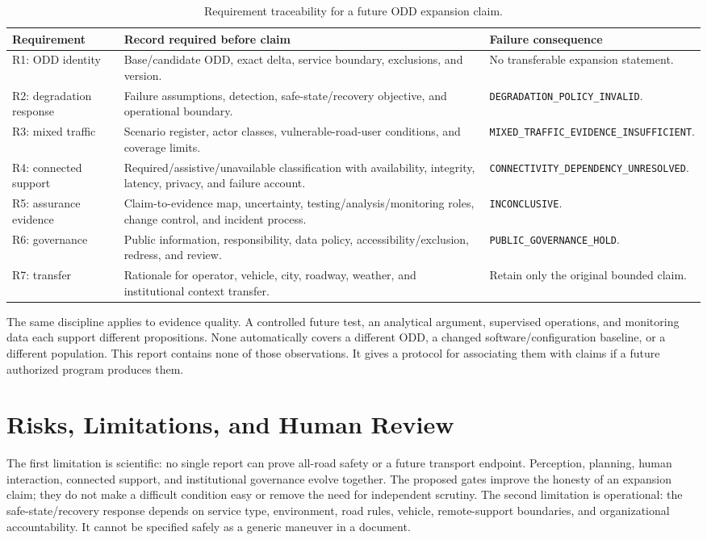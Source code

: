 \documentclass[conference]{../../../../Conference-LaTeX-template_10-17-19/IEEEtran}
\begin{document}
\begin{table}[!t]
\caption{Requirement traceability for a future ODD expansion claim.}
\label{tab:requirements}
\centering
\small
\begin{tabularx}{\textwidth}{lY Y}
\toprule
Requirement & Record required before claim & Failure consequence \\
\midrule
R1: ODD identity & Base/candidate ODD, exact delta, service boundary, exclusions, and version. & No transferable expansion statement. \\
R2: degradation response & Failure assumptions, detection, safe-state/recovery objective, and operational boundary. & \texttt{DEGRADATION\_POLICY\_INVALID}. \\
R3: mixed traffic & Scenario register, actor classes, vulnerable-road-user conditions, and coverage limits. & \texttt{MIXED\_TRAFFIC\_EVIDENCE\_INSUFFICIENT}. \\
R4: connected support & Required/assistive/unavailable classification with availability, integrity, latency, privacy, and failure account. & \texttt{CONNECTIVITY\_DEPENDENCY\_UNRESOLVED}. \\
R5: assurance evidence & Claim-to-evidence map, uncertainty, testing/analysis/monitoring roles, change control, and incident process. & \texttt{INCONCLUSIVE}. \\
R6: governance & Public information, responsibility, data policy, accessibility/exclusion, redress, and review. & \texttt{PUBLIC\_GOVERNANCE\_HOLD}. \\
R7: transfer & Rationale for operator, vehicle, city, roadway, weather, and institutional context transfer. & Retain only the original bounded claim. \\
\bottomrule
\end{tabularx}
\end{table}

The same discipline applies to evidence quality. A controlled future test, an analytical argument, supervised operations, and monitoring data each support different propositions. None automatically covers a different ODD, a changed software/configuration baseline, or a different population. This report contains none of those observations. It gives a protocol for associating them with claims if a future authorized program produces them.

\section{Risks, Limitations, and Human Review}
The first limitation is scientific: no single report can prove all-road safety or a future transport endpoint. Perception, planning, human interaction, connected support, and institutional governance evolve together. The proposed gates improve the honesty of an expansion claim; they do not make a difficult condition easy or remove the need for independent scrutiny. The second limitation is operational: the safe-state/recovery response depends on service type, environment, road rules, vehicle, remote-support boundaries, and organizational accountability. It cannot be specified safely as a generic maneuver in a document.
\end{document}
